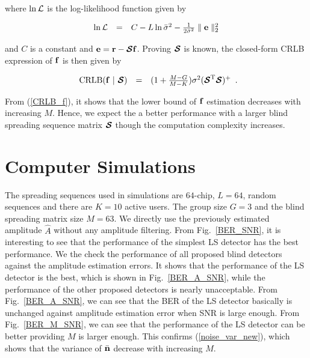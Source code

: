 \documentclass[a4paper,10pt,fleqn, twocolumn]{IEEETran}
\newcommand{\br}{{\mathbf r}}
\newcommand{\bn}{{\bf n}}
\newcommand{\bbf}{{\bf f}}
\newcommand{\bcS}{{\mbox {\boldmath ${\cal S}$}}}
\begin{document}
\noindent where $\ln{\cal L}$ is the log-likelihood function given
by

\begin{equation}
\begin{array}{rcl}
\ln{\cal
L}&=&C-L\ln\bar{\sigma}^2-\frac{1}{2\bar{\sigma}^2}\parallel\mathbf{e}\parallel_2^2
\end{array}\label{logl}
\end{equation}

\noindent and $C$ is a constant and $\mathbf{e}=\br-\bcS\bbf$.
Proving $\bcS$ is known, the closed-form CRLB expression of $\bbf$
is then given by

\begin{equation}
\begin{array}{rcl}
{\rm CRLB}(\bbf\ |\ \bcS) &
=&(1+\frac{M-G}{M-K})\sigma^{2}(\bcS^{\rm T}\bcS)^{\rm +}
\end{array}.\label{CRLB_f}
\end{equation}

\noindent From (\ref{CRLB_f}), it shows that the lower bound of
$\bbf$ estimation decreases with increasing $M$. Hence, we expect
the a better performance with a larger blind spreading sequence
matrix $\bcS$ though the computation complexity increases.


\section{Computer Simulations}

The spreading sequences used in simulations are $64$-chip, $L=64$,
random sequences and there are $K=10$ active users. The group size
$G=3$ and the blind spreading matrix size $M=63$. We directly use
the previously estimated amplitude $\hat{A}$ without any amplitude
filtering. From Fig.~\ref{BER_SNR}, it is interesting to see that
the performance of the simplest LS detector has the best
performance. We the check the performance of all proposed blind
detectors against the amplitude estimation errors. It shows that
the performance of the LS detector is the best, which is shown in
Fig.~\ref{BER_A_SNR}, while the performance of the other proposed
detectors is nearly unacceptable. From Fig.~\ref{BER_A_SNR}, we
can see that the BER of the LS detector basically is unchanged
against amplitude estimation error when SNR is large enough. From
Fig.~\ref{BER_M_SNR}, we can see that the performance of the LS
detector can be better providing $M$ is larger enough. This
confirms (\ref{noise_var_new}), which shows that the variance of
$\bar{\bn}$ decrease with increasing $M$.
\end{document}
